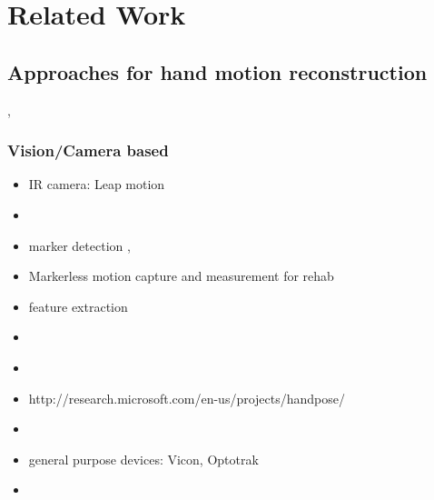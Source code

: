 
\lhead[\chaptername~\thechapter]{\rightmark}

\rhead[\leftmark]{}

\lfoot[\thepage]{}

\cfoot{}

\rfoot[]{\thepage}


\chapter{Related Work}
\label{cha:relatedWork}


\section{Approaches for hand motion reconstruction}

\cite{sturman1994survey}, \cite{dipietro2008survey}

\subsection{Vision/Camera based}
\begin{itemize}
\item IR camera: Leap motion
\item \cite{Digits}
\item marker detection \cite{Wang:2009:RTH}, \cite{metcalf2008validation}
\item Markerless motion capture and measurement for rehab \cite{metcalf2013markerless}
\item feature extraction \cite{ionescu2005dynamic}
\item \cite{john2006advanced}
\item \cite{yun2013accurate}
\item http://research.microsoft.com/en-us/projects/handpose/
\item \cite{hasan2014human}
\item general purpose devices: Vicon, Optotrak \cite{supuk2008evaluation}
\item \cite{sharp2015accurate}
\end{itemize}

